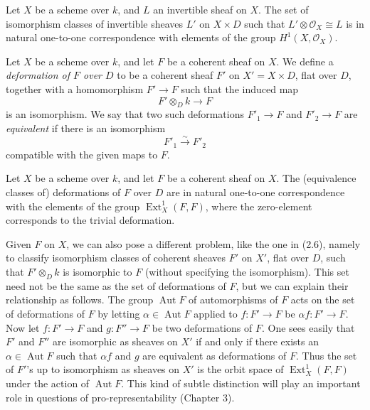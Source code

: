 \begin{proposition}
\label{proposition-line-bundle-first-order}
Let $X$ be a scheme over $k$, and $L$ an
invertible sheaf on $X$. The set of
isomorphism classes of invertible sheaves
$L'$ on $X\times D$ such that
$L'\otimes\mathcal{O}_X\cong L$ is in natural
one-to-one correspondence with elements of
the group $H^1(X,\mathcal{O}_X)$.
\end{proposition}

\begin{definition}
\label{definition-coherent-first-order}
Let $X$ be a scheme over $k$, and let $F$ be
a coherent sheaf on $X$. We define a
\emph{deformation of $F$ over $D$} to be a
coherent sheaf $F'$ on $X'=X\times D$, flat
over $D$, together with a homomorphism
$F'\to F$ such that the induced map
$$
F'\otimes_D k\longrightarrow F
$$
is an isomorphism. We say that two such
deformations $F'_1\to F$ and $F'_2\to F$ are
\emph{equivalent} if there is an isomorphism
$$
F'_1\xrightarrow{\sim}F'_2
$$
compatible with the given maps to $F$.
\end{definition}

\begin{theorem}
\label{theorem-coherent-first-order}
Let $X$ be a scheme over $k$, and let $F$ be
a coherent sheaf on $X$. The (equivalence
classes of) deformations of $F$ over $D$ are
in natural one-to-one correspondence with
the elements of the group
$\operatorname{Ext}^1_X(F,F)$, where the
zero-element corresponds to the trivial
deformation.
\end{theorem}

\begin{remark}
\label{remark-unmarked-coherent-first-order}
Given $F$ on $X$, we can also pose a
different problem, like the one in (2.6),
namely to classify isomorphism classes of
coherent sheaves $F'$ on $X'$, flat over
$D$, such that $F'\otimes_D k$ is isomorphic
to $F$ (without specifying the isomorphism).
This set need not be the same as the set of
deformations of $F$, but we can explain
their relationship as follows. The group
$\operatorname{Aut}F$ of automorphisms of
$F$ acts on the set of deformations of $F$
by letting $\alpha\in\operatorname{Aut}F$
applied to $f:F'\to F$ be
$\alpha f:F'\to F$. Now let $f:F'\to F$ and
$g:F''\to F$ be two deformations of $F$. One
sees easily that $F'$ and $F''$ are
isomorphic as sheaves on $X'$ if and only if
there exists an
$\alpha\in\operatorname{Aut}F$ such that
$\alpha f$ and $g$ are equivalent as
deformations of $F$. Thus the set of $F'$'s
up to isomorphism as sheaves on $X'$ is the
orbit space of $\operatorname{Ext}^1_X(F,F)$
under the action of $\operatorname{Aut}F$.
This kind of subtle distinction will play an
important role in questions of
pro-representability (Chapter 3).
\end{remark}


